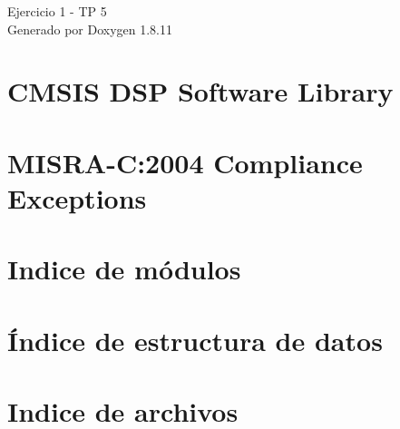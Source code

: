 \documentclass[twoside]{book}
\newcommand{\+}{\discretionary{\mbox{\scriptsize$\hookleftarrow$}}{}{}}
\newcommand{\clearemptydoublepage}{%
  \newpage{\pagestyle{empty}\cleardoublepage}%
}
\begin{document}
\hypersetup{pageanchor=false,
             bookmarksnumbered=true,
             pdfencoding=unicode
            }
\begin{titlepage}
\vspace*{7cm}
\begin{center}%
{\Large Ejercicio 1 -\/ TP 5 }\\
\vspace*{1cm}
{\large Generado por Doxygen 1.8.11}\\
\end{center}
\end{titlepage}
\clearemptydoublepage
\tableofcontents
\clearemptydoublepage
{}
\hypersetup{pageanchor=true}

\chapter{C\+M\+S\+IS D\+SP Software Library}
\label{index}\hypertarget{index}{}
\chapter{M\+I\+S\+R\+A-\/C\+:2004 Compliance Exceptions}
\label{CMSIS_MISRA_Exceptions}
\hypertarget{CMSIS_MISRA_Exceptions}{}

\chapter{Indice de módulos}

\chapter{Índice de estructura de datos}

\chapter{Indice de archivos}

\end{document}
